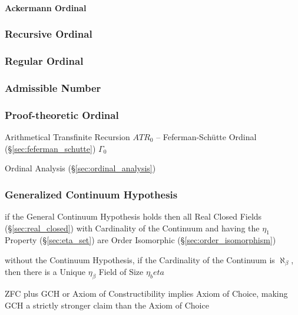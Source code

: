 \paragraph{Ackermann Ordinal}\label{sec:ackermann_ordinal}\hfill



\subsubsection{Recursive Ordinal}\label{sec:recursive_ordinal}

\subsubsection{Regular Ordinal}\label{sec:regular_ordinal}

\subsubsection{Admissible Number}\label{sec:admissible_ordinal}

\subsubsection{Proof-theoretic Ordinal}\label{sec:proof_ordinal}

Arithmetical Transfinite Recursion $ATR_0$ -- Feferman-Sch\"utte
Ordinal (\S\ref{sec:feferman_schutte}) $\Gamma_0$

Ordinal Analysis (\S\ref{sec:ordinal_analysis})



\subsubsection{Generalized Continuum Hypothesis}
\label{sec:generalized_continuum}

if the General Continuum Hypothesis holds then all Real Closed Fields
(\S\ref{sec:real_closed}) with Cardinality of the Continuum and having the
$\eta_1$ Property (\S\ref{sec:eta_set}) are Order Isomorphic
(\S\ref{sec:order_isomorphism})

without the Continuum Hypothesis, if the Cardinality of the Continuum is
$\aleph_\beta$, then there is a Unique $\eta_\beta$ Field of Size $\eta_beta$

ZFC plus GCH or Axiom of Constructibility implies Axiom of Choice, making GCH a
strictly stronger claim than the Axiom of Choice



